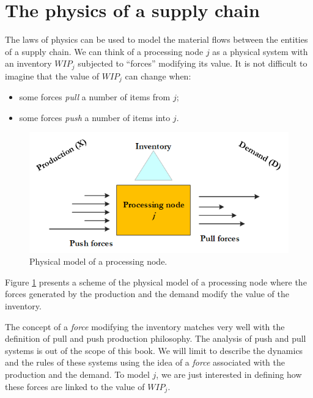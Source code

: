 \section{The physics of a supply chain} \label{sect_supplyChainPhysics}

The laws of physics can be used to model the material flows between the entities of a supply chain. We can think of a processing node $j$ as a physical system with an inventory $WIP_j$ subjected to “forces” modifying its value. It is not difficult to imagine that the value of $WIP_j$ can change when:
\begin{itemize}
    \item some forces \textit{pull} a number of items from $j$;
    \item 	some forces \textit{push} a number of items into $j$.
\end{itemize}

\begin{figure}[hbt!]
\centering
\includegraphics[width=1\textwidth]{SectionIntroduction/informationFramework_figures/fig_processingNode.png}
\captionsetup{type=figure}
\caption{Physical model of a processing node.}
\label{fig_processingNode}
\end{figure}

Figure \ref{fig_processingNode} presents a scheme of the physical model of a processing node where the forces generated by the production and the demand modify the value of the inventory.\par

The concept of a \textit{force} modifying the inventory matches very well with the definition of pull and push production philosophy. The analysis of push and pull systems is out of the scope of this book. We will limit to describe the dynamics and the rules of these systems using the idea of a \textit{force} associated with the production and the demand. To model $j$, we are just interested in defining how these forces are linked to the value of $WIP_j$. \par

